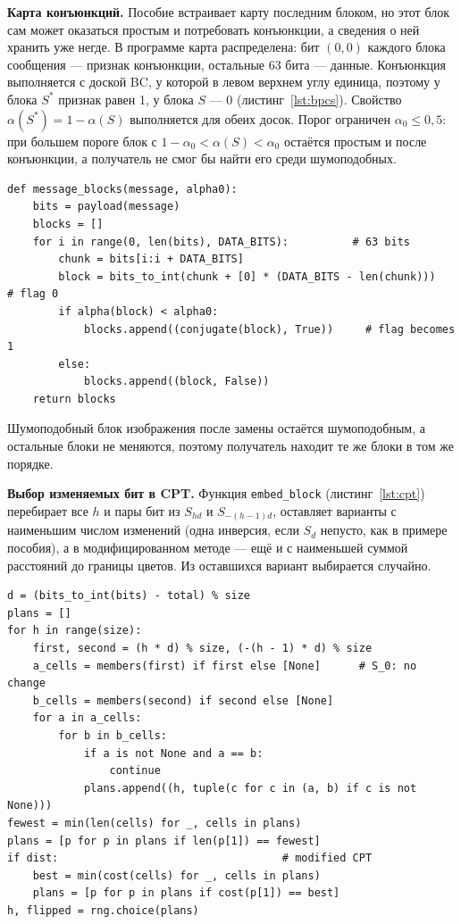 \documentclass[14pt,a4paper]{extarticle}
\begin{document}
\textbf{Карта конъюнкций.} Пособие встраивает карту последним блоком, но этот блок
сам может оказаться простым и потребовать конъюнкции, а сведения о ней хранить уже
негде. В программе карта распределена: бит $(0, 0)$ каждого блока сообщения ---
признак конъюнкции, остальные 63 бита --- данные. Конъюнкция выполняется с доской BC,
у которой в левом верхнем углу единица, поэтому у блока $S^*$ признак равен 1, у
блока $S$ --- 0 (листинг~\ref{lst:bpcs}). Свойство $\alpha(S^*) = 1 - \alpha(S)$
выполняется для обеих досок. Порог ограничен $\alpha_0 \le 0{,}5$: при большем пороге
блок с $1 - \alpha_0 < \alpha(S) < \alpha_0$ остаётся простым и после конъюнкции, а
получатель не смог бы найти его среди шумоподобных.

\begin{lstlisting}[style=python, caption={Блоки сообщения BPCS}, label={lst:bpcs}]
def message_blocks(message, alpha0):
    bits = payload(message)
    blocks = []
    for i in range(0, len(bits), DATA_BITS):          # 63 bits
        chunk = bits[i:i + DATA_BITS]
        block = bits_to_int(chunk + [0] * (DATA_BITS - len(chunk)))   # flag 0
        if alpha(block) < alpha0:
            blocks.append((conjugate(block), True))     # flag becomes 1
        else:
            blocks.append((block, False))
    return blocks
\end{lstlisting}

Шумоподобный блок изображения после замены остаётся шумоподобным, а остальные блоки
не меняются, поэтому получатель находит те же блоки в том же порядке.

\textbf{Выбор изменяемых бит в CPT.} Функция \texttt{embed\_block}
(листинг~\ref{lst:cpt}) перебирает все $h$ и пары бит из $S_{hd}$ и $S_{-(h-1)d}$,
оставляет варианты с наименьшим числом изменений (одна инверсия, если $S_d$ непусто,
как в примере пособия), а в модифицированном методе --- ещё и с наименьшей суммой
расстояний до границы цветов. Из оставшихся вариант выбирается случайно.

\begin{lstlisting}[style=python, caption={Встраивание в блок CPT}, label={lst:cpt}]
d = (bits_to_int(bits) - total) % size
plans = []
for h in range(size):
    first, second = (h * d) % size, (-(h - 1) * d) % size
    a_cells = members(first) if first else [None]      # S_0: no change
    b_cells = members(second) if second else [None]
    for a in a_cells:
        for b in b_cells:
            if a is not None and a == b:
                continue
            plans.append((h, tuple(c for c in (a, b) if c is not None)))
fewest = min(len(cells) for _, cells in plans)
plans = [p for p in plans if len(p[1]) == fewest]
if dist:                                   # modified CPT
    best = min(cost(cells) for _, cells in plans)
    plans = [p for p in plans if cost(p[1]) == best]
h, flipped = rng.choice(plans)
\end{lstlisting}
\end{document}
